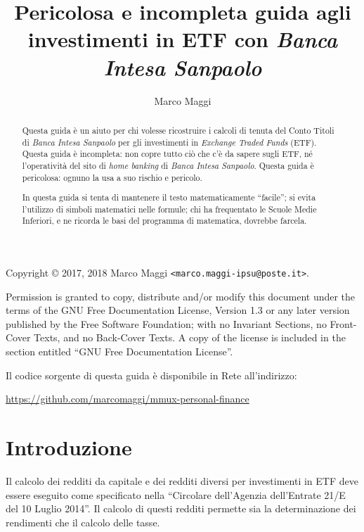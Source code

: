 \documentclass[12pt,a4paper]{article}
\author{Marco Maggi}
\title{Pericolosa e incompleta guida agli investimenti in ETF con \emph{Banca Intesa Sanpaolo}}
\begin{document}
\maketitle

\begin{abstract}
  \noindent
  Questa guida è un  aiuto per chi volesse ricostruire i calcoli  di tenuta del Conto
  Titoli  di \emph{Banca  Intesa  Sanpaolo} per  gli  investimenti in  \emph{Exchange
     Traded Funds} (ETF).  Questa guida è incompleta:  non copre tutto ciò che c'è da
  sapere sugli ETF,  né l'operatività del sito di \emph{home  banking} di \emph{Banca
     Intesa Sanpaolo}.   Questa guida  è pericolosa:  ognuno la usa  a suo  rischio e
  pericolo.

  In questa guida si tenta di mantenere il testo matematicamente ``facile''; si evita
  l'utilizzo di simboli matematici nelle formule;  chi ha frequentato le Scuole Medie
  Inferiori, e ne ricorda le basi del programma di matematica, dovrebbe farcela.
\end{abstract}

\tableofcontents

\newpage{}

\noindent
Copyright \copyright{} 2017, 2018 Marco Maggi \texttt{<marco.maggi-ipsu@poste.it>}.

Permission is granted to copy, distribute and/or modify this document under the terms
of the GNU Free Documentation License, Version  1.3 or any later version published by
the Free Software  Foundation; with no Invariant Sections, no  Front-Cover Texts, and
no Back-Cover Texts.  A copy of the license is included in the section entitled ``GNU
Free Documentation License''.

Il codice sorgente di questa guida è disponibile in Rete all'indirizzo:
\begin{center}
  \url{https://github.com/marcomaggi/mmux-personal-finance}
\end{center}

\newpage{}

\section{Introduzione}


Il calcolo dei redditi da capitale e dei redditi diversi per investimenti in ETF deve
essere eseguito come specificato nella ``Circolare dell'Agenzia dell'Entrate 21/E del
10 Luglio  2014''.  Il calcolo di  questi redditi permette sia  la determinazione dei
rendimenti che il calcolo delle tasse.
\end{document}
